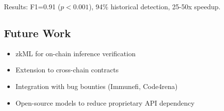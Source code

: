 \documentclass[11pt]{article}
\theoremstyle{definition}
\theoremstyle{plain}
\theoremstyle{remark}
\begin{document}
Results: F1=0.91 ($p<0.001$), 94\% historical detection, 25-50x speedup.

\subsection{Future Work}

\begin{itemize}
    \item zkML for on-chain inference verification
    \item Extension to cross-chain contracts
    \item Integration with bug bounties (Immunefi, Code4rena)
    \item Open-source models to reduce proprietary API dependency
\end{itemize}
\end{document}
